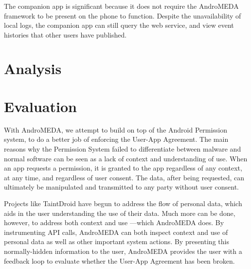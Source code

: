 \documentclass{acm_proc_article-sp}
\begin{document}
The companion app is significant because it does not require the AndroMEDA framework to be present on the phone to function. Despite the unavailability of local logs, the companion app can still query the web service, and view event histories that other users have published.





























\section{Analysis}





























\section{Evaluation}

With AndroMEDA, we attempt to build on top of the Android Permission system, to do a better job of enforcing the User-App Agreement. The main reasons why the Permission System failed to differentiate between malware and normal software can be seen as a lack of context and understanding of use. When an app requests a permission, it is granted to the app regardless of any context, at any time, and regardless of user consent. The data, after being requested, can ultimately be manipulated and transmitted to any party without user consent. 

Projects like TaintDroid\citep{enck2010taintdroid} have begun to address the flow of personal data, which aids in the user understanding the use of their data. Much more can be done, however, to address both context and use ---which AndroMEDA does. By instrumenting API calls, AndroMEDA can both inspect context and use of personal data as well as other important system actions. By presenting this normally-hidden information to the user, AndroMEDA provides the user with a feedback loop to evaluate whether the User-App Agreement has been broken.
\end{document}

